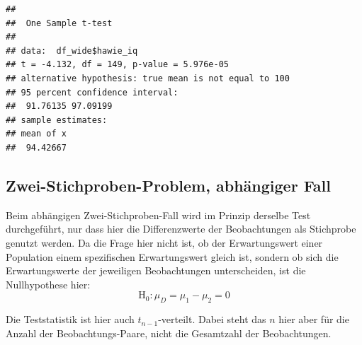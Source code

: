 \documentclass[
]{book}
\newenvironment{Shaded}{\begin{snugshade}}{\end{snugshade}}
\newcommand{\AttributeTok}[1]{\textcolor[rgb]{0.77,0.63,0.00}{#1}}
\newcommand{\ConstantTok}[1]{\textcolor[rgb]{0.00,0.00,0.00}{#1}}
\newcommand{\DecValTok}[1]{\textcolor[rgb]{0.00,0.00,0.81}{#1}}
\newcommand{\FunctionTok}[1]{\textcolor[rgb]{0.00,0.00,0.00}{#1}}
\newcommand{\NormalTok}[1]{#1}
\newcommand{\OtherTok}[1]{\textcolor[rgb]{0.56,0.35,0.01}{#1}}
\newcommand{\SpecialCharTok}[1]{\textcolor[rgb]{0.00,0.00,0.00}{#1}}
\newcommand{\StringTok}[1]{\textcolor[rgb]{0.31,0.60,0.02}{#1}}
\begin{document}
\begin{Shaded}
\end{Shaded}

\begin{verbatim}
## 
##  One Sample t-test
## 
## data:  df_wide$hawie_iq
## t = -4.132, df = 149, p-value = 5.976e-05
## alternative hypothesis: true mean is not equal to 100
## 95 percent confidence interval:
##  91.76135 97.09199
## sample estimates:
## mean of x 
##  94.42667
\end{verbatim}

\hypertarget{zwei-stichproben-problem-abhuxe4ngiger-fall}{%
\subsection{Zwei-Stichproben-Problem, abhängiger Fall}\label{zwei-stichproben-problem-abhuxe4ngiger-fall}}

Beim abhängigen Zwei-Stichproben-Fall wird im Prinzip derselbe Test durchgeführt, nur dass hier die Differenzwerte der Beobachtungen als Stichprobe genutzt werden. Da die Frage hier nicht ist, ob der Erwartungswert einer Population einem spezifischen Erwartungswert gleich ist, sondern ob sich die Erwartungswerte der jeweiligen Beobachtungen unterscheiden, ist die Nullhypothese hier: \[\text{H}_0: { \mu}_D =  { \mu}_1 - { \mu}_2= 0 \]

Die Teststatistik ist hier auch \(t_{n-1}\)-verteilt. Dabei steht das \(n\) hier aber für die Anzahl der Beobachtungs-Paare, nicht die Gesamtzahl der Beobachtungen.

\begin{Shaded}
\end{Shaded}
\end{document}
